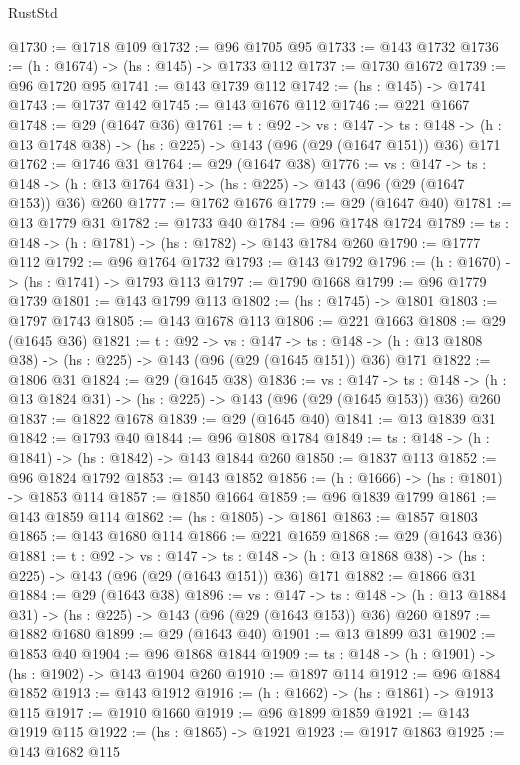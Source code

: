 \begin{lexlean}{RustStd}
\begin{coremodule}
{\begin{coremodule}
{{{{{@1730 := @1718 @109
@1732 := @96 @1705 @95
@1733 := @143 @1732
@1736 := (h : @1674) -> (hs : @145) -> @1733 @112
@1737 := @1730 @1672
@1739 := @96 @1720 @95
@1741 := @143 @1739 @112
@1742 := (hs : @145) -> @1741
@1743 := @1737 @142
@1745 := @143 @1676 @112
@1746 := @221 @1667
@1748 := @29 (@1647 @36)
@1761 := {t : @92} ->
  {vs : @147} ->
  {ts : @148} -> (h : @13 @1748 @38) -> (hs : @225) -> @143 (@96 (@29 (@1647 @151)) @36) @171
@1762 := @1746 @31
@1764 := @29 (@1647 @38)
@1776 := {vs : @147} ->
  {ts : @148} -> (h : @13 @1764 @31) -> (hs : @225) -> @143 (@96 (@29 (@1647 @153)) @36) @260
@1777 := @1762 @1676
@1779 := @29 (@1647 @40)
@1781 := @13 @1779 @31
@1782 := @1733 @40
@1784 := @96 @1748 @1724
@1789 := {ts : @148} -> (h : @1781) -> (hs : @1782) -> @143 @1784 @260
@1790 := @1777 @112
@1792 := @96 @1764 @1732
@1793 := @143 @1792
@1796 := (h : @1670) -> (hs : @1741) -> @1793 @113
@1797 := @1790 @1668
@1799 := @96 @1779 @1739
@1801 := @143 @1799 @113
@1802 := (hs : @1745) -> @1801
@1803 := @1797 @1743
@1805 := @143 @1678 @113
@1806 := @221 @1663
@1808 := @29 (@1645 @36)
@1821 := {t : @92} ->
  {vs : @147} ->
  {ts : @148} -> (h : @13 @1808 @38) -> (hs : @225) -> @143 (@96 (@29 (@1645 @151)) @36) @171
@1822 := @1806 @31
@1824 := @29 (@1645 @38)
@1836 := {vs : @147} ->
  {ts : @148} -> (h : @13 @1824 @31) -> (hs : @225) -> @143 (@96 (@29 (@1645 @153)) @36) @260
@1837 := @1822 @1678
@1839 := @29 (@1645 @40)
@1841 := @13 @1839 @31
@1842 := @1793 @40
@1844 := @96 @1808 @1784
@1849 := {ts : @148} -> (h : @1841) -> (hs : @1842) -> @143 @1844 @260
@1850 := @1837 @113
@1852 := @96 @1824 @1792
@1853 := @143 @1852
@1856 := (h : @1666) -> (hs : @1801) -> @1853 @114
@1857 := @1850 @1664
@1859 := @96 @1839 @1799
@1861 := @143 @1859 @114
@1862 := (hs : @1805) -> @1861
@1863 := @1857 @1803
@1865 := @143 @1680 @114
@1866 := @221 @1659
@1868 := @29 (@1643 @36)
@1881 := {t : @92} ->
  {vs : @147} ->
  {ts : @148} -> (h : @13 @1868 @38) -> (hs : @225) -> @143 (@96 (@29 (@1643 @151)) @36) @171
@1882 := @1866 @31
@1884 := @29 (@1643 @38)
@1896 := {vs : @147} ->
  {ts : @148} -> (h : @13 @1884 @31) -> (hs : @225) -> @143 (@96 (@29 (@1643 @153)) @36) @260
@1897 := @1882 @1680
@1899 := @29 (@1643 @40)
@1901 := @13 @1899 @31
@1902 := @1853 @40
@1904 := @96 @1868 @1844
@1909 := {ts : @148} -> (h : @1901) -> (hs : @1902) -> @143 @1904 @260
@1910 := @1897 @114
@1912 := @96 @1884 @1852
@1913 := @143 @1912
@1916 := (h : @1662) -> (hs : @1861) -> @1913 @115
@1917 := @1910 @1660
@1919 := @96 @1899 @1859
@1921 := @143 @1919 @115
@1922 := (hs : @1865) -> @1921
@1923 := @1917 @1863
@1925 := @143 @1682 @115
}}}}}
\end{coremodule}}
\end{coremodule}
\end{lexlean}
